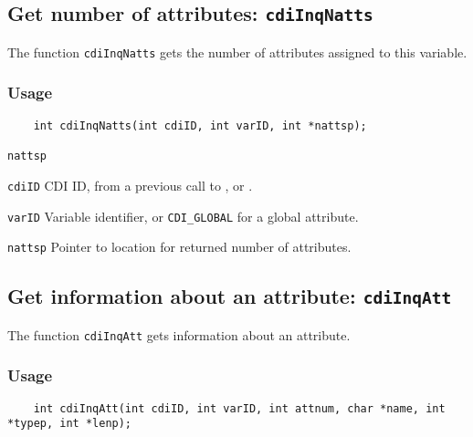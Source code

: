 

\subsection{Get number of attributes: \texttt{cdiInqNatts}}
\label{cdiInqNatts}

The function {\texttt{cdiInqNatts}} gets the number of attributes assigned to this variable.

\subsubsection*{Usage}

\begin{verbatim}
    int cdiInqNatts(int cdiID, int varID, int *nattsp);
\end{verbatim}

\hspace*{4mm}\begin{minipage}[]{15cm}
\begin{deflist}{\texttt{nattsp}\ }
\item[\texttt{cdiID}]
CDI ID, from a previous call to {}, {} or {}.
\item[\texttt{varID}]
Variable identifier, or {\texttt{CDI\_GLOBAL}} for a global attribute.
\item[\texttt{nattsp}]
Pointer to location for returned number of attributes.

\end{deflist}
\end{minipage}


\subsection{Get information about an attribute: \texttt{cdiInqAtt}}
\label{cdiInqAtt}

The function {\texttt{cdiInqAtt}} gets information about an attribute.

\subsubsection*{Usage}

\begin{verbatim}
    int cdiInqAtt(int cdiID, int varID, int attnum, char *name, int *typep, int *lenp);
\end{verbatim}

